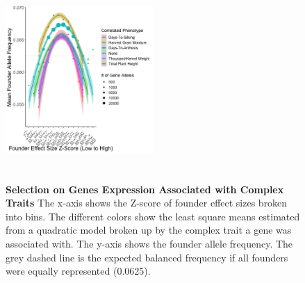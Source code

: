 \documentclass[article,9pt,twocolumn,twoside]{rilabRxiv}
\begin{document}
\begin{figure}[!ht]
\centering
\includegraphics[width=0.5\textwidth,height=3in]{figures/frown_quad.png}
\caption{\textbf{Selection on Genes Expression Associated with Complex Traits}
The x-axis shows the Z-score of founder effect sizes broken into bins.
The different colors show the least square means estimated from a quadratic model broken up by the complex trait a gene was associated with.
The y-axis shows the founder allele frequency.
The grey dashed line is the expected balanced frequency if all founders were equally represented (0.0625).}
\label{fig:pheno_frownfigure}
\end{figure}
\end{document}
